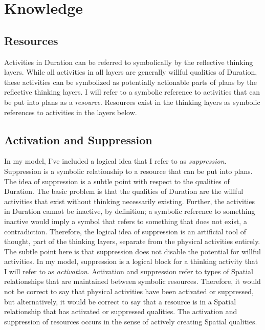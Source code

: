 \chapter{Knowledge}
\label{chapter:knowledge}

\section{Resources}

Activities in Duration can be referred to symbolically by the
reflective thinking layers.  While all activities in all layers are
generally willful qualities of Duration, these activities can be
symbolized as potentially actionable parts of plans by the reflective
thinking layers.  I will refer to a symbolic reference to activities
that can be put into plans as a \emph{resource}.  Resources exist in
the thinking layers as symbolic references to activities in the layers
below.

\section{Activation and Suppression}

In my model, I've included a logical idea that I refer to as
\emph{suppression}.  Suppression is a symbolic relationship to a
resource that can be put into plans.  The idea of suppression is a
subtle point with respect to the qualities of Duration.  The basic
problem is that the qualities of Duration are the willful activities
that exist without thinking necessarily existing.  Further, the
activities in Duration cannot be inactive, by definition; a symbolic
reference to something inactive would imply a symbol that refers to
something that does not exist, a contradiction.  Therefore, the
logical idea of suppression is an artificial tool of thought, part of
the thinking layers, separate from the physical activities entirely.
The subtle point here is that suppression does not disable the
potential for willful activities.  In my model, suppression is a
logical block for a thinking activity that I will refer to as
\emph{activation}.  Activation and suppression refer to types of
Spatial relationships that are maintained between symbolic resources.
Therefore, it would not be correct to say that physical activities
have been activated or suppressed, but alternatively, it would be
correct to say that a resource is in a Spatial relationship that has
activated or suppressed qualities.  The activation and suppression of
resources occurs in the sense of actively creating Spatial qualities.

